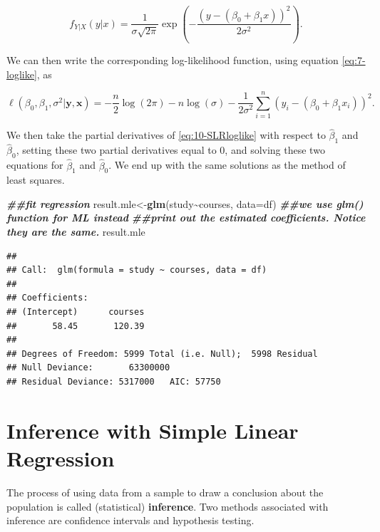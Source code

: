\documentclass[
]{book}
\newenvironment{Shaded}{\begin{snugshade}}{\end{snugshade}}
\newcommand{\AttributeTok}[1]{\textcolor[rgb]{0.13,0.29,0.53}{#1}}
\newcommand{\DocumentationTok}[1]{\textcolor[rgb]{0.56,0.35,0.01}{\textbf{\textit{#1}}}}
\newcommand{\FunctionTok}[1]{\textcolor[rgb]{0.13,0.29,0.53}{\textbf{#1}}}
\newcommand{\NormalTok}[1]{#1}
\newcommand{\OtherTok}[1]{\textcolor[rgb]{0.56,0.35,0.01}{#1}}
\newcommand{\SpecialCharTok}[1]{\textcolor[rgb]{0.81,0.36,0.00}{\textbf{#1}}}
\begin{document}
\begin{equation} 
f_{Y|X}(y|x) = \frac{1}{\sigma \sqrt{2 \pi}} \exp \left(-\frac{(y - (\beta_0+\beta_{1} x))^2}{2 \sigma^2} \right).
\label{eq:10-SLRpdf}
\end{equation}

We can then write the corresponding log-likelihood function, using equation \eqref{eq:7-loglike}, as

\begin{equation}
\ell(\beta_0, \beta_1, \sigma^2 | \boldsymbol{y}, \boldsymbol{x}) = -\frac{n}{2} \log(2\pi) - n \log(\sigma) - \frac{1}{2 \sigma^2} \sum_{i=1}^n \left(y_i - (\beta_0 + \beta_1 x_i) \right)^2.
\label{eq:10-SLRloglike}
\end{equation}

We then take the partial derivatives of \eqref{eq:10-SLRloglike} with respect to \(\hat{\beta}_1\) and \(\hat{\beta}_0\), setting these two partial derivatives equal to 0, and solving these two equations for \(\hat{\beta}_1\) and \(\hat{\beta}_0\). We end up with the same solutions as the method of least squares.

\begin{Shaded}
\begin{Highlighting}[]
\DocumentationTok{\#\#fit regression}
\NormalTok{result.mle}\OtherTok{\textless{}{-}}\FunctionTok{glm}\NormalTok{(study}\SpecialCharTok{\textasciitilde{}}\NormalTok{courses, }\AttributeTok{data=}\NormalTok{df) }\DocumentationTok{\#\#we use glm() function for ML instead}
\DocumentationTok{\#\#print out the estimated coefficients. Notice they are the same. }
\NormalTok{result.mle}
\end{Highlighting}
\end{Shaded}

\begin{verbatim}
## 
## Call:  glm(formula = study ~ courses, data = df)
## 
## Coefficients:
## (Intercept)      courses  
##       58.45       120.39  
## 
## Degrees of Freedom: 5999 Total (i.e. Null);  5998 Residual
## Null Deviance:       63300000 
## Residual Deviance: 5317000   AIC: 57750
\end{verbatim}

\section{Inference with Simple Linear Regression}\label{SLRinf}

The process of using data from a sample to draw a conclusion about the population is called (statistical) \textbf{inference}. Two methods associated with inference are confidence intervals and hypothesis testing.
\end{document}
